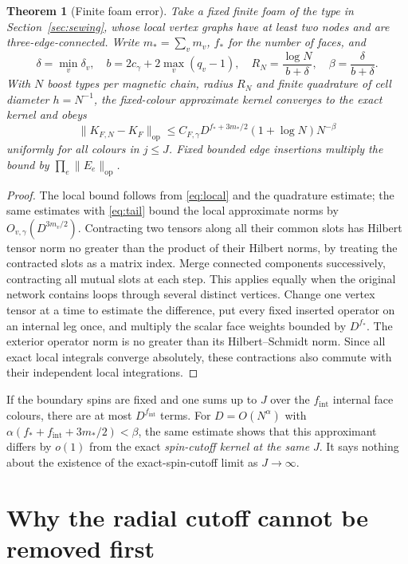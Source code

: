 \documentclass[11pt]{article}
\newtheorem{theorem}{Theorem}
\theoremstyle{remark}
\begin{document}
\begin{theorem}[Finite foam error]\label{thm:foam}
Take a fixed finite foam of the type in Section~\ref{sec:sewing}, whose local vertex graphs have at least two nodes and are three-edge-connected. Write \(m_* = \sum_v m_v\), \(f_*\) for the number of faces, and
\[
\delta=\min_v\delta_v,\quad
b=2c_\gamma+2\max_v(q_v-1),\quad
R_N=\frac{\log N}{b+\delta},\quad
\beta=\frac{\delta}{b+\delta}.
\]
With \(N\) boost types per magnetic chain, radius \(R_N\) and finite quadrature of cell diameter \(h=N^{-1}\), the fixed-colour approximate kernel converges to the exact kernel and obeys
\begin{equation}\label{eq:global}
\|K_{F,N}-K_F\|_{\mathrm{op}}
\le C_{F,\gamma}D^{f_*+3m_*/2}(1+\log N)N^{-\beta}
\end{equation}
uniformly for all colours in \(j\le J\). Fixed bounded edge insertions multiply the bound by \(\prod_e\|E_e\|_{\mathrm{op}}\).
\end{theorem}
\begin{proof}
The local bound follows from \eqref{eq:local} and the quadrature estimate; the same estimates with \eqref{eq:tail} bound the local approximate norms by \(O_{v,\gamma}(D^{3m_v/2})\). Contracting two tensors along all their common slots has Hilbert tensor norm no greater than the product of their Hilbert norms, by treating the contracted slots as a matrix index. Merge connected components successively, contracting all mutual slots at each step. This applies equally when the original network contains loops through several distinct vertices. Change one vertex tensor at a time to estimate the difference, put every fixed inserted operator on an internal leg once, and multiply the scalar face weights bounded by \(D^{f_*}\). The exterior operator norm is no greater than its Hilbert--Schmidt norm. Since all exact local integrals converge absolutely, these contractions also commute with their independent local integrations.
\end{proof}

If the boundary spins are fixed and one sums up to \(J\) over the \(f_{\mathrm{int}}\) internal face colours, there are at most \(D^{f_{\mathrm{int}}}\) terms. For \(D=O(N^\alpha)\) with \(\alpha(f_*+f_{\mathrm{int}}+3m_*/2)<\beta\), the same estimate shows that this approximant differs by \(o(1)\) from the exact \emph{spin-cutoff kernel at the same} \(J\). It says nothing about the existence of the exact-spin-cutoff limit as \(J\to\infty\).

\section{Why the radial cutoff cannot be removed first}\label{sec:recurrence}
\end{document}
